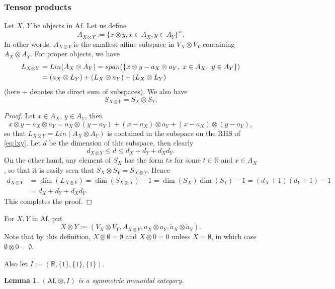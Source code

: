 \documentclass[12pt]{article}
\newtheorem{lemma}{Lemma}
\theoremstyle{definition}
\theoremstyle{remark}
\def \Af{\mathrm{Af}}
\begin{document}
\subsubsection{Tensor products}

Let $X$, $Y$ be objects in $\Af$. Let us define
\[
A_{X\otimes Y}:=\{x\otimes y, x\in A_X, y\in A_Y\}^{\approx}.
\]
In other words, $A_{X\otimes Y}$ is the smallest affine subspace in $V_X\otimes V_Y$ containing
$A_X\otimes A_Y$. 
For proper objects, we  have
\begin{align}
L_{X\otimes Y}&=Lin(A_X\otimes A_Y)=span(\{x\otimes y-a_X\otimes a_Y,\ x\in A_X,\ y\in
A_Y\})\notag\\
&= (a_X\otimes L_Y)+ (L_X\otimes a_Y)+ (L_X\otimes L_Y)\label{eq:lxy}
\end{align}
(here $+$ denotes the direct sum of subspaces). We also have
\[
S_{X\otimes Y}=S_X\otimes S_Y.
\]

\begin{proof} Let $x\in A_X$, $y\in A_Y$, then
\[
x\otimes y-a_X\otimes a_Y=a_X\otimes (y-a_Y)+(x-a_X)\otimes a_Y+(x-a_X)\otimes (y-a_Y),
\]
so that $L_{X\otimes Y}=Lin(A_X\otimes A_Y)$ is contained in the subspace on the RHS of \eqref{eq:lxy}.
Let $d$ be the dimension of this subspace, then clearly
\[
d_{X\otimes Y}\le d\le d_X+d_Y+d_Xd_Y.
\]
On the other hand, any element of $S_X$ has the form $tx$ for some $t\in \mathbb R$ and
$x\in A_X$, so that it is easily seen that $S_X\otimes S_Y=S_{X\otimes Y}$. 
Hence 
\begin{align*}
d_{X\otimes Y}&=\dim(L_{X\otimes Y})=\dim(S_{X\otimes
X})-1=\dim(S_X)\dim(S_Y)-1=(d_X+1)(d_Y+1)-1\\
&=d_X+d_Y+d_Xd_Y.
\end{align*}
This completes the proof.

\end{proof}



For $X,Y$ in $\Af$, put 
\[
X\otimes Y:=(V_X\otimes V_Y,A_{X\otimes Y},a_X\otimes a_Y, \tilde
a_X\otimes \tilde a_Y).
\]
Note that by this definition, $X\otimes \emptyset =\emptyset$ and
$X\otimes 0=0$ unless $X=\emptyset$, in which case $\emptyset\otimes 0=\emptyset$. 


Also let $I:=(\mathbb R, \{1\},\{1\},\{1\})$. 


\begin{lemma}\label{lemma:monoidal}
$(\Af,\otimes, I)$ is a symmetric
monoidal category.
\end{lemma}
\end{document}

